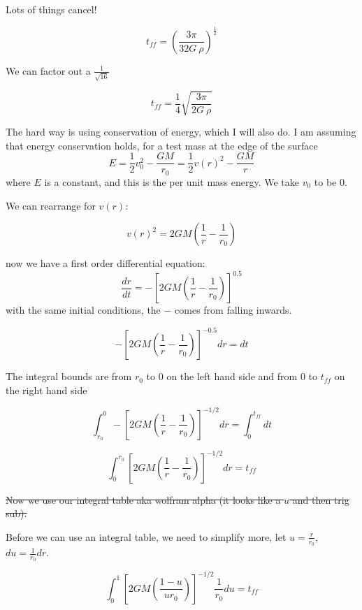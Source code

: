 Lots of things cancel!

\begin{equation} 
    t_{ff} = (\frac{3\pi}{32G\ \rho })^{\frac{1}{2}}
\end{equation}

We can factor out a $\frac{1}{\sqrt{16}}$

\begin{equation} 
    \boxed{t_{ff} = \frac{1}{4}\sqrt{\frac{3\pi}{2G\ \rho }}}
\end{equation}






The hard way is using conservation of energy, which I will also do. I am assuming that energy conservation holds, for a test mass at the edge of the surface
\begin{equation}
    E = \frac{1}{2}v_0^2 - \frac{GM}{r_0} = \frac{1}{2}v(r)^2 - \frac{GM}{r} 
\end{equation}
where $E$ is a constant, and this is the per unit mass energy. We take $v_0$ to be 0. 

We can rearrange for $v(r)$:

\begin{equation}
    v(r)^2 = 2GM(\frac{1}{r} - \frac{1}{r_0}) 
\end{equation}

now we have a first order differential equation: 
\begin{equation}
    \frac{dr}{dt} = -[2GM(\frac{1}{r} - \frac{1}{r_0})]^{0.5}
\end{equation}
with the same initial conditions, the $-$ comes from falling inwards. 

\begin{equation}
     -[2GM(\frac{1}{r} - \frac{1}{r_0})]^{-0.5} dr = dt
\end{equation}

The integral bounds are from $r_0$ to $0$ on the left hand side and from $ 0$ to $t_{ff}$ on the right hand side

\begin{equation}
    \int_{r_0}^{0} 
    -\left[2GM\!\left(\frac{1}{r}-\frac{1}{r_0}\right)\right]^{-1/2} dr 
    = \int_{0}^{t_{ff}} dt
\end{equation}

\begin{equation}
    \int_{0}^{r_0} 
    \left[2GM\!\left(\frac{1}{r}-\frac{1}{r_0}\right)\right]^{-1/2} dr 
    = t_{ff}
\end{equation}

\sout{Now we use our integral table aka wolfram alpha (it looks like a $u$ and then trig sub).}

Before we can use an integral table, we need to simplify more, let $u = \frac{r}{r_0}$, $du = \frac{1}{r_0}dr$. 

\begin{equation}
    \int_{0}^{1} 
    [2GM(\frac{1-u}{ur_0})]^{-1/2} \frac{1}{r_0}du 
    = t_{ff}
\end{equation}







